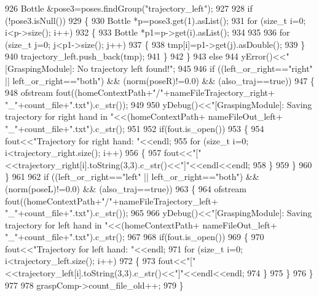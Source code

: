 \begin{DoxyCode}
926     Bottle &pose3=poses.findGroup(\textcolor{stringliteral}{"trajectory\_left"});
927 
928     \textcolor{keywordflow}{if} (!pose3.isNull())
929     \{
930         Bottle *p=pose3.get(1).asList();
931         \textcolor{keywordflow}{for} (\textcolor{keywordtype}{size\_t} i=0; i<p->size(); i++)
932         \{
933             Bottle *p1=p->get(i).asList();
934 
935 
936             \textcolor{keywordflow}{for} (\textcolor{keywordtype}{size\_t} j=0; j<p1->size(); j++)
937             \{
938                 tmp[i]=p1->get(j).asDouble();
939             \}
940             trajectory\_left.push\_back(tmp);
941         \}
942     \}
943     \textcolor{keywordflow}{else}
944         yError()<<\textcolor{stringliteral}{"[GraspingModule]: No trajectory left found!"};
945 
946     \textcolor{keywordflow}{if} ((left\_or\_right==\textcolor{stringliteral}{"right"} || left\_or\_right==\textcolor{stringliteral}{"both"}) && (norm(poseR)!=0.0) && (also\_traj==\textcolor{keyword}{true}))
947     \{
948         ofstream fout((homeContextPath+\textcolor{stringliteral}{"/"}+nameFileTrajectory\_right+ \textcolor{stringliteral}{"\_"}+count\_file+\textcolor{stringliteral}{".txt"}).c\_str());
949 
950         yDebug()<<\textcolor{stringliteral}{"[GraspingModule]: Saving trajectory for right hand in "}<<(homeContextPath+
      nameFileOut\_left+ \textcolor{stringliteral}{"\_"}+count\_file+\textcolor{stringliteral}{".txt"}).c\_str();
951 
952         \textcolor{keywordflow}{if}(fout.is\_open())
953         \{
954             fout<<\textcolor{stringliteral}{"Trajectory for right hand: "}<<endl;
955             \textcolor{keywordflow}{for} (\textcolor{keywordtype}{size\_t} i=0; i<trajectory\_right.size(); i++)
956             \{
957                 fout<<\textcolor{stringliteral}{"["}<<trajectory\_right[i].toString(3,3).c\_str()<<\textcolor{stringliteral}{"]"}<<endl<<endl;
958             \}
959         \}
960     \}
961 
962     \textcolor{keywordflow}{if} ((left\_or\_right==\textcolor{stringliteral}{"left"} || left\_or\_right==\textcolor{stringliteral}{"both"}) && (norm(poseL)!=0.0) && (also\_traj==\textcolor{keyword}{true}))
963     \{
964         ofstream fout((homeContextPath+\textcolor{stringliteral}{"/"}+nameFileTrajectory\_left+ \textcolor{stringliteral}{"\_"}+count\_file+\textcolor{stringliteral}{".txt"}).c\_str());
965 
966         yDebug()<<\textcolor{stringliteral}{"[GraspingModule]: Saving trajectory for left hand in "}<<(homeContextPath+
      nameFileOut\_left+ \textcolor{stringliteral}{"\_"}+count\_file+\textcolor{stringliteral}{".txt"}).c\_str();
967 
968         \textcolor{keywordflow}{if}(fout.is\_open())
969         \{
970             fout<<\textcolor{stringliteral}{"Trajectory for left hand: "}<<endl;
971             \textcolor{keywordflow}{for} (\textcolor{keywordtype}{size\_t} i=0; i<trajectory\_left.size(); i++)
972             \{
973                 fout<<\textcolor{stringliteral}{"["}<<trajectory\_left[i].toString(3,3).c\_str()<<\textcolor{stringliteral}{"]"}<<endl<<endl;
974             \}
975         \}
976     \}
977 
978     graspComp->count\_file\_old++;
979 \}
\end{DoxyCode}
